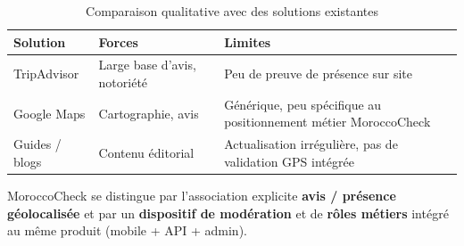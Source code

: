 \begin{table}[H]
\centering
\caption{Comparaison qualitative avec des solutions existantes}
\label{tab:concurrents}
\small
\begin{tabular}{@{}p{3cm}p{5cm}p{5cm}@{}}
\toprule
\textbf{Solution} & \textbf{Forces} & \textbf{Limites} \\
\midrule
TripAdvisor & Large base d'avis, notoriété & Peu de preuve de présence sur site \\
Google Maps & Cartographie, avis & Générique, peu spécifique au positionnement métier MoroccoCheck \\
Guides / blogs & Contenu éditorial & Actualisation irrégulière, pas de validation GPS intégrée \\
\bottomrule
\end{tabular}
\end{table}

MoroccoCheck se distingue par l'association explicite \textbf{avis / présence géolocalisée} et par un \textbf{dispositif de modération} et de \textbf{rôles métiers} intégré au même produit (mobile + API + admin).
